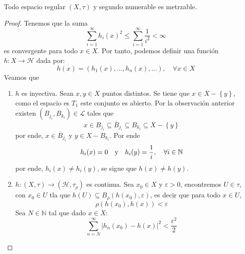 \documentclass[12pt]{report}
\theoremstyle{largebreak}
\newcommand\abs[1]{\ensuremath{\left|#1\right|}}
\newcommand\cf[3]{\ensuremath{#1:#2\rightarrow#3}}
\begin{document}
    \begin{theor}
        Todo espacio regular $(X,\tau)$ y segundo numerable es metrzable.
    \end{theor}

    \begin{proof}
        Tenemos que la suma
        \begin{equation*}
            \sum_{ i=1}^\infty h_i(x)^2\leq\sum_{ i=1}^\infty\frac{1}{i^2} <\infty
        \end{equation*}
        es convergente para todo $x\in X$. Por tanto, podemos definir una función $\cf{h}{X}{\mathcal{H}}$ dada por:
        \begin{equation*}
            h(x)=(h_1(x),...,h_n(x),...),\quad\forall x\in X
        \end{equation*}
        Veamos que
        \begin{enumerate}
            \item $h$ es inyectiva. Sean $x,y\in X$ puntos distintos. Se tiene que $x\in X-\left\{y\right\}$, como el espacio es $T_1$ este conjunto es abierto. Por la observación anterior existen $(B_{ j_i},B_{ k_i})\in\mathcal{L}$ tales que
            \begin{equation*}
                x\in B_{ j_i}\subseteq\overline{B}_{ j_i}\subseteq B_{ k_i}\subseteq X-\left\{y\right\}
            \end{equation*}
            por ende, $x\in\overline{B}_{ j_i}$ y $y\in X-B_{ k_i}$. Por ende
            \begin{equation*}
                h_i(x)=0\quad\textup{y}\quad h_i(y)=\frac{1}{i},\quad\forall i\in\mathbb{N}
            \end{equation*}
            por ende, $h_i(x)\neq h_i(y)$, se sigue que $h(x)\neq h(y)$.
            \item $\cf{h}{(X,\tau)}{(\mathcal{H},\tau_{\rho})}$ es continua. Sea $x_0\in X$ y $\varepsilon>0$, encontremos $U\in\tau$, con $x_0\in U$ tla que $h(U)\subseteq B_\rho(h(x_0),\varepsilon)$, es decir que para todo $x\in U$,
            \begin{equation*}
                \rho(h(x_0),h(x))<\varepsilon
            \end{equation*}
            Sea $N\in\mathbb{N}$ tal que dado $x\in X$:
            \begin{equation*}
                \sum_{ n=N}^\infty\abs{ h_n(x_0)-h(x)}^2<\frac{\varepsilon^2}{2}
            \end{equation*}

\end{enumerate}
\end{proof}
\end{document}
